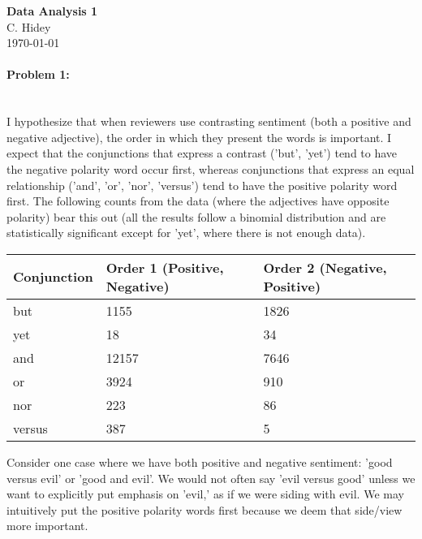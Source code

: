 \documentclass[12pt]{article}
\begin{document}
\begin{center}
  \textbf{Data Analysis 1} \\
  C. Hidey \\
  \today
\end{center}

\paragraph{{\bf Problem 1:} } 
\text{} \\
I hypothesize that when reviewers use contrasting sentiment (both a positive and negative adjective), the order in which they present the words is important.  I expect that the conjunctions that express a contrast ('but', 'yet') tend to have the negative polarity word occur first, whereas conjunctions that express an equal relationship ('and', 'or', 'nor', 'versus') tend to have the positive polarity word first.  The following counts from the data (where the adjectives have opposite polarity) bear this out (all the results follow a binomial distribution and are statistically significant except for 'yet', where there is not enough data).

\begin{tabular}{|l|l|l|}
\hline 
Conjunction & Order 1 (Positive, Negative) & Order 2 (Negative, Positive) \\
\hline 
but & 1155 & 1826 \\
\hline 
yet & 18 & 34 \\
\hline 
and & 12157 & 7646 \\
\hline 
or & 3924 & 910 \\
\hline 
nor & 223 & 86 \\
\hline 
versus & 387 & 5 \\
\hline 
\end{tabular}

Consider one case where we have both positive and negative sentiment: 'good versus evil' or 'good and evil'.  We would not often say 'evil versus good' unless we want to explicitly put emphasis on 'evil,' as if we were siding with evil.  We may intuitively put the positive polarity words first because we deem that side/view more important.
\end{document}
